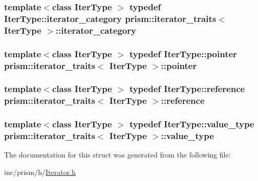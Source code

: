 \subsubsection[{\texorpdfstring{iterator\+\_\+category}{iterator_category}}]{\setlength{\rightskip}{0pt plus 5cm}template$<$class Iter\+Type $>$ typedef Iter\+Type\+::iterator\+\_\+category {\bf prism\+::iterator\+\_\+traits}$<$ Iter\+Type $>$\+::{\bf iterator\+\_\+category}}\hypertarget{structprism_1_1iterator__traits_a2e20906a677a5a465bf343ff4281a010}{}\label{structprism_1_1iterator__traits_a2e20906a677a5a465bf343ff4281a010}
\subsubsection[{\texorpdfstring{pointer}{pointer}}]{\setlength{\rightskip}{0pt plus 5cm}template$<$class Iter\+Type $>$ typedef Iter\+Type\+::pointer {\bf prism\+::iterator\+\_\+traits}$<$ Iter\+Type $>$\+::{\bf pointer}}\hypertarget{structprism_1_1iterator__traits_a5ec4c84886d15b5efa1bb3fd0984dd71}{}\label{structprism_1_1iterator__traits_a5ec4c84886d15b5efa1bb3fd0984dd71}
\subsubsection[{\texorpdfstring{reference}{reference}}]{\setlength{\rightskip}{0pt plus 5cm}template$<$class Iter\+Type $>$ typedef Iter\+Type\+::reference {\bf prism\+::iterator\+\_\+traits}$<$ Iter\+Type $>$\+::{\bf reference}}\hypertarget{structprism_1_1iterator__traits_af4ddc7a938960bb8c558e6eae9ee1548}{}\label{structprism_1_1iterator__traits_af4ddc7a938960bb8c558e6eae9ee1548}
\subsubsection[{\texorpdfstring{value\+\_\+type}{value_type}}]{\setlength{\rightskip}{0pt plus 5cm}template$<$class Iter\+Type $>$ typedef Iter\+Type\+::value\+\_\+type {\bf prism\+::iterator\+\_\+traits}$<$ Iter\+Type $>$\+::{\bf value\+\_\+type}}\hypertarget{structprism_1_1iterator__traits_a764c6740051f048bb81ba63d993e96cd}{}\label{structprism_1_1iterator__traits_a764c6740051f048bb81ba63d993e96cd}


The documentation for this struct was generated from the following file\+:\begin{DoxyCompactItemize}
\item 
inc/prism/h/\hyperlink{_iterator_8h}{Iterator.\+h}\end{DoxyCompactItemize}

